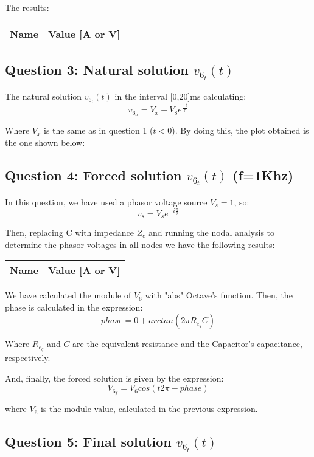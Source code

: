 The results:

\begin{center}
  \begin{tabular}{ | c | c | }
    \hline    
    {\bf Name} & {\bf Value [A or V]} \\ \hline
    
    \hline
  \end{tabular}
\end{center}


\subsection{Question 3: Natural solution $v_{6_t}(t)$}
The natural solution $v_{6_t}(t)$ in the interval [0,20]ms calculating:
\begin{equation}
     v_{6_n} = {V_x-V_8}e^{\frac{-t}{\tau}}
\end{equation}\par
Where $V_x$ is the same as in question 1 ($t<0$).
By doing this, the plot obtained is the one shown below:


\subsection{Question 4: Forced solution $v_{6_t}(t)$ (f=1Khz)}
In this question, we have used a phasor voltage source $V_s = 1$, so:
\begin{equation}
     v_s = {V_s}e^{-i\frac{\pi}{2}}
\end{equation}\par
Then, replacing C with  impedance $Z_c$ and running the nodal analysis to determine the phasor voltages in all nodes we have the following results:\par

\begin{center}
  \begin{tabular}{ | c | c | }
    \hline    
    {\bf Name} & {\bf Value [A or V]} \\ \hline
    
    \hline
  \end{tabular}
\end{center}

We have calculated the module of $V_6$ with "abs" Octave's function. Then, the phase is calculated in the expression:
\begin{equation}
     phase = 0 + arctan({2\pi}{R_{e_q}}{C})
\end{equation}\par

Where $R_{e_q}$ and $C$ are the equivalent resistance and the Capacitor's capacitance, respectively.

And, finally, the forced solution is given by the expression:
\begin{equation}
     V_{6_f}= V_6cos({t}{2\pi} - phase)
\end{equation}\par
where $V_6$ is the module value, calculated in the previous expression.


\subsection{Question 5: Final solution $v_{6_t}(t)$ }




